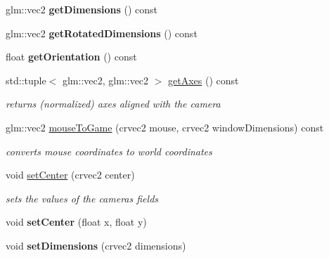 \begin{DoxyCompactItemize}
glm\+::vec2 {\bfseries get\+Dimensions} () const
\item 
\mbox{\label{classnta_1_1Camera2D_a6b3b7c18d66f680c05087b94214bc98f}} 
glm\+::vec2 {\bfseries get\+Rotated\+Dimensions} () const
\item 
\mbox{\label{classnta_1_1Camera2D_a5cf5e5e022f29952af085a63980e737c}} 
float {\bfseries get\+Orientation} () const
\item 
\mbox{\label{classnta_1_1Camera2D_a395b5bfa81b603a3d4e78d6c54aa8212}} 
std\+::tuple$<$ glm\+::vec2, glm\+::vec2 $>$ \hyperlink{classnta_1_1Camera2D_a395b5bfa81b603a3d4e78d6c54aa8212}{get\+Axes} () const
\begin{DoxyCompactList}\small\item\em returns (normalized) axes aligned with the camera \end{DoxyCompactList}\item 
glm\+::vec2 \hyperlink{classnta_1_1Camera2D_afb20fb9823724babdc8d18b17336169c}{mouse\+To\+Game} (crvec2 mouse, crvec2 window\+Dimensions) const
\begin{DoxyCompactList}\small\item\em converts mouse coordinates to world coordinates \end{DoxyCompactList}\item 
\mbox{\label{classnta_1_1Camera2D_a11a7edceed0964b375fbfe154b9a9895}} 
void \hyperlink{classnta_1_1Camera2D_a11a7edceed0964b375fbfe154b9a9895}{set\+Center} (crvec2 center)
\begin{DoxyCompactList}\small\item\em sets the values of the camera\textquotesingle{}s fields \end{DoxyCompactList}\item 
\mbox{\label{classnta_1_1Camera2D_a5e887ee36c95789e3455ab2f3bb3f568}} 
void {\bfseries set\+Center} (float x, float y)
\item 
\mbox{\label{classnta_1_1Camera2D_a3b133bef64504b488b04ce18e206544b}} 
void {\bfseries set\+Dimensions} (crvec2 dimensions)
\item 
\mbox{\label{classnta_1_1Camera2D_a253821b9dc464678c80ff92c31a8689f}} 

\end{DoxyCompactItemize}
